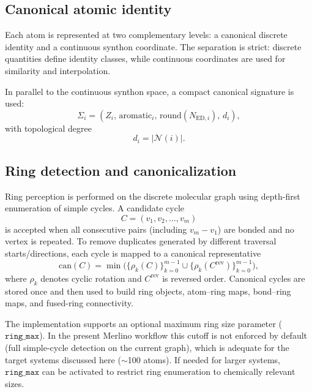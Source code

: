 \documentclass[journal=jctcce,manuscript=article]{achemso}
\begin{document}
\subsection{Canonical atomic identity}
Each atom is represented at two complementary levels: a canonical discrete identity and a continuous synthon coordinate. The separation is strict: discrete quantities define identity classes, while continuous coordinates are used for similarity and interpolation.

In parallel to the continuous synthon space, a compact canonical signature is used:
\begin{equation}
\Sigma_i=(Z_i,\,\mathrm{aromatic}_i,\,\mathrm{round}(N_{\mathrm{ED},i}),\,d_i),
\end{equation}
with topological degree
\begin{equation}
d_i=|\mathcal{N}(i)|.
\end{equation}

\subsection{Ring detection and canonicalization}
Ring perception is performed on the discrete molecular graph using depth-first enumeration of simple cycles. A candidate cycle
\begin{equation}
C=(v_1,v_2,\dots,v_m)
\end{equation}
is accepted when all consecutive pairs (including $v_m\!-\!v_1$) are bonded and no vertex is repeated.
To remove duplicates generated by different traversal starts/directions, each cycle is mapped to a canonical representative
\begin{equation}
\mathrm{can}(C)=\min\Big(\{\rho_k(C)\}_{k=0}^{m-1}\cup\{\rho_k(C^{\mathrm{rev}})\}_{k=0}^{m-1}\Big),
\end{equation}
where $\rho_k$ denotes cyclic rotation and $C^{\mathrm{rev}}$ is reversed order. Canonical cycles are stored once and then used to build ring objects, atom--ring maps, bond--ring maps, and fused-ring connectivity.

The implementation supports an optional maximum ring size parameter ($\texttt{ring\_max}$). In the present Merlino workflow this cutoff is not enforced by default (full simple-cycle detection on the current graph), which is adequate for the target systems discussed here ($\sim$100 atoms). If needed for larger systems, $\texttt{ring\_max}$ can be activated to restrict ring enumeration to chemically relevant sizes.
\end{document}
